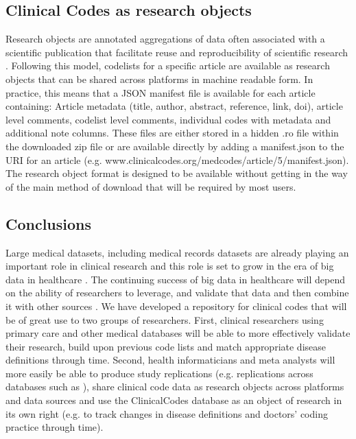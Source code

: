 \documentclass[10pt]{article}
\begin{document}


\subsection*{Clinical Codes as research objects}


Research objects are annotated aggregations of data often associated with a scientific publication that facilitate reuse and reproducibility of scientific research \cite{Bechhofer2010}. Following this model, codelists for a specific article are available as research objects that can be shared across platforms in machine readable form.  In practice, this means that a JSON manifest file is available for each article containing: Article metadata (title, author, abstract, reference, link, doi), article level comments, codelist level comments, individual codes with metadata and additional note columns. These files are either stored in a hidden .ro file within the downloaded zip file or are available directly by adding a manifest.json to the URI for an article (e.g. www.clinicalcodes.org/medcodes/article/5/manifest.json).  The research object format is designed to be available without getting in the way of the main method of download that will be required by most users.

\subsection*{Conclusions}


Large medical datasets, including medical records datasets are already playing an important role in clinical research and this role is set to grow in the era of big data in healthcare \cite{Wang2013}. The continuing success of big data in healthcare will depend on the ability of researchers to leverage, and validate that data and then combine it with other sources \cite{Murdoch2013}.  We have developed a repository for clinical codes that will be of great use to two groups of researchers.  First, clinical researchers using primary care and other medical databases will be able to more effectively validate their research, build upon previous code lists and match appropriate disease definitions through time. Second, health informaticians and meta analysts will more easily be able to produce study replications (e.g. replications across databases such as \cite{Reeves2014}), share clinical code data as research objects across platforms and data sources and use the ClinicalCodes database as an object of research in its own right (e.g. to track changes in disease definitions and doctors' coding practice through time).
\end{document}
